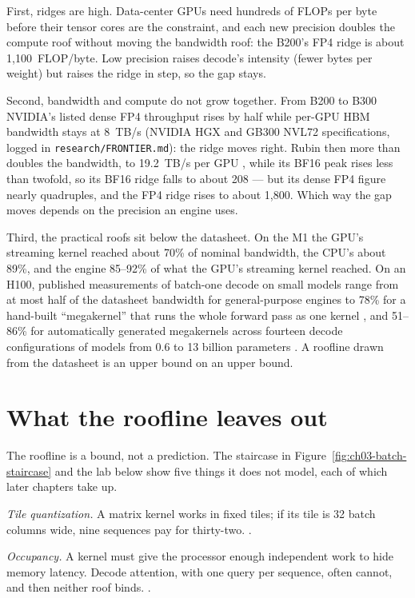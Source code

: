 First, ridges are high. Data-center GPUs need hundreds of FLOPs per byte before
their tensor cores are the constraint, and each new precision doubles the
compute roof without moving the bandwidth roof: the B200's FP4 ridge is about
1,100~FLOP/byte. Low precision raises decode's intensity (fewer bytes per
weight) but raises the ridge in step, so the gap stays.

Second, bandwidth and compute do not grow together. From B200 to B300 NVIDIA's
listed dense FP4 throughput rises by half while per-GPU HBM bandwidth stays at
8~TB/s (NVIDIA HGX and GB300 NVL72 specifications, logged in
\texttt{research/FRONTIER.md}): the ridge moves right. Rubin then more than
doubles the bandwidth, to 19.2~TB/s per GPU \cite{nvidia2026verarubin}, while
its BF16 peak rises less than twofold, so its BF16 ridge falls to about 208 ---
but its dense FP4 figure nearly quadruples, and the FP4 ridge rises to about
1,800. Which way the gap moves depends on the precision an engine uses.

Third, the practical roofs sit below the datasheet. On the M1 the GPU's
streaming kernel reached about 70\% of nominal bandwidth, the CPU's about 89\%,
and the engine 85--92\% of what the GPU's streaming kernel reached. On an
H100, published measurements of batch-one decode on small models range from
at most half of the datasheet bandwidth for general-purpose engines to 78\%
for a hand-built ``megakernel'' that runs the whole forward pass as one kernel
\cite{spector2025megakernel}, and 51--86\% for automatically generated
megakernels across fourteen decode configurations of models from 0.6 to 13
billion parameters \cite{li2026forgemegakernel}. A roofline drawn from the
datasheet is an upper bound on an upper bound.

\section{What the roofline leaves out}

The roofline is a bound, not a prediction. The staircase in
Figure~\ref{fig:ch03-batch-staircase} and the lab below show five things it
does not model, each of which later chapters take up.

\emph{Tile quantization.} A matrix kernel works in fixed tiles; if its tile is
32 batch columns wide, nine sequences pay for thirty-two. .

\emph{Occupancy.} A kernel must give the processor enough independent work to
hide memory latency. Decode attention, with one query per sequence, often
cannot, and then neither roof binds. .

